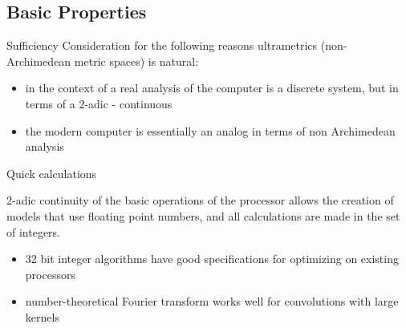 \subsection{Basic Properties}

\begin{frame}{Sufficiency}
 Consideration for the following reasons ultrametrics (non-Archimedean metric spaces) is natural:
  \begin{itemize}
  \pause
  \item
in the context of a real analysis of the computer is a discrete system, but in terms of a 2-adic - continuous
     
  \pause
  \item
the modern computer is essentially an analog in terms of non Archimedean analysis
    
  \end{itemize}


\end{frame}

\begin{frame}{Quick calculations}

 2-adic continuity of the basic operations of the processor allows the creation of models that use floating point numbers, and all calculations are made   in the set of integers.

 \begin{itemize}
 \pause
  \item

 32 bit integer algorithms have good specifications for optimizing on existing processors
 \item
 \pause
 number-theoretical Fourier transform works well for convolutions with large kernels
  \end{itemize}

\end{frame}


